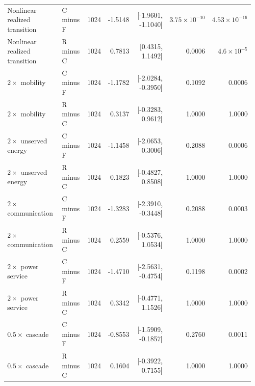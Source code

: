 \begin{longtable}{@{}llrrrrr@{}}
Nonlinear realized transition & C minus F & 1024 & -1.5148 & [-1.9601, -1.1040] & $3.75\times10^{-10}$ & $4.53\times10^{-19}$ \\
Nonlinear realized transition & R minus C & 1024 & 0.7813 & [0.4315, 1.1492] & 0.0006 & $4.6\times10^{-5}$ \\
$2\times$ mobility & C minus F & 1024 & -1.1782 & [-2.0284, -0.3950] & 0.1092 & 0.0006 \\
$2\times$ mobility & R minus C & 1024 & 0.3137 & [-0.3283, 0.9612] & 1.0000 & 1.0000 \\
$2\times$ unserved energy & C minus F & 1024 & -1.1458 & [-2.0653, -0.3006] & 0.2088 & 0.0006 \\
$2\times$ unserved energy & R minus C & 1024 & 0.1823 & [-0.4827, 0.8508] & 1.0000 & 1.0000 \\
$2\times$ communication & C minus F & 1024 & -1.3283 & [-2.3910, -0.3448] & 0.2088 & 0.0003 \\
$2\times$ communication & R minus C & 1024 & 0.2559 & [-0.5376, 1.0534] & 1.0000 & 1.0000 \\
$2\times$ power service & C minus F & 1024 & -1.4710 & [-2.5631, -0.4754] & 0.1198 & 0.0002 \\
$2\times$ power service & R minus C & 1024 & 0.3342 & [-0.4771, 1.1526] & 1.0000 & 1.0000 \\
$0.5\times$ cascade & C minus F & 1024 & -0.8553 & [-1.5909, -0.1857] & 0.2760 & 0.0011 \\
$0.5\times$ cascade & R minus C & 1024 & 0.1604 & [-0.3922, 0.7155] & 1.0000 & 1.0000 \\
\end{longtable}

